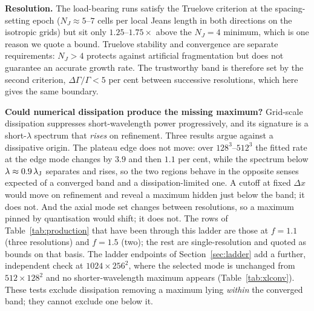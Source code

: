 \documentclass[usenatbib,twoside,twocolumn]{mnras}
\begin{document}
\smallskip\noindent\textbf{Resolution.} The load-bearing runs satisfy the Truelove criterion at the spacing-setting epoch ($N_J\approx5$--$7$ cells per local Jeans length in both directions on the isotropic grids) but sit only $1.25$--$1.75\times$ above the $N_J=4$ minimum, which is one reason we quote a bound. Truelove stability and convergence are separate requirements: $N_J>4$ protects against artificial fragmentation but does not guarantee an accurate growth rate. The trustworthy band is therefore set by the second criterion, $\Delta\Gamma/\Gamma<5$ per cent between successive resolutions, which here gives the same boundary.

\smallskip\noindent\textbf{Could numerical dissipation produce the missing maximum?} Grid-scale dissipation suppresses short-wavelength power progressively, and its signature is a short-$\lambda$ spectrum that \emph{rises} on refinement. Three results argue against a dissipative origin. The plateau edge does not move: over $128^3$--$512^3$ the fitted rate at the edge mode changes by $3.9$ and then $1.1$ per cent, while the spectrum below $\lambda\approx0.9\,\lambda_{\rm J}$ separates and rises, so the two regions behave in the opposite senses expected of a converged band and a dissipation-limited one. A cutoff at fixed $\Delta x$ would move on refinement and reveal a maximum hidden just below the band; it does not. And the axial mode set changes between resolutions, so a maximum pinned by quantisation would shift; it does not. The rows of Table~\ref{tab:production} that have been through this ladder are those at $f=1.1$ (three resolutions) and $f=1.5$ (two); the rest are single-resolution and quoted as bounds on that basis. The ladder endpoints of Section~\ref{sec:ladder} add a further, independent check at $1024\times256^2$, where the selected mode is unchanged from $512\times128^2$ and no shorter-wavelength maximum appears (Table~\ref{tab:xlconv}). These tests exclude dissipation removing a maximum lying \emph{within} the converged band; they cannot exclude one below it.
\end{document}
